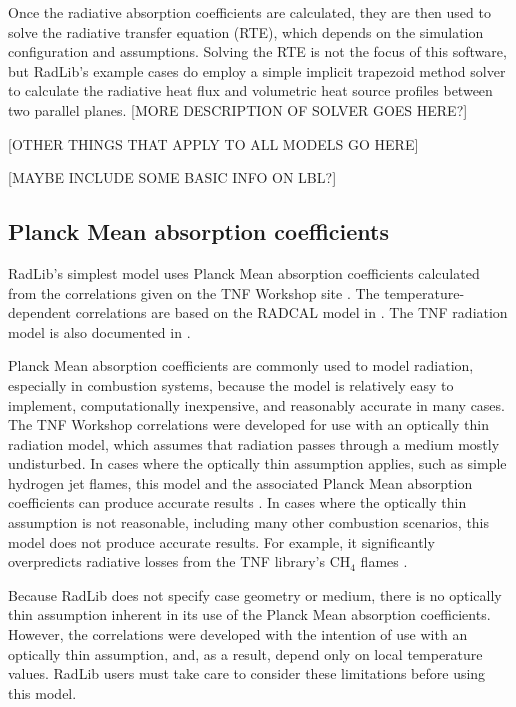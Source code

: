\documentclass[preprint,12pt, a4paper]{elsarticle}
\begin{document}
Once the radiative absorption coefficients are calculated, they are then used to solve the radiative transfer equation (RTE), which depends on the simulation configuration and assumptions. Solving the RTE is not the focus of this software, but RadLib's example cases do employ a simple implicit trapezoid method solver to calculate the radiative heat flux and volumetric heat source profiles between two parallel planes. [MORE DESCRIPTION OF SOLVER GOES HERE?]

[OTHER THINGS THAT APPLY TO ALL MODELS GO HERE]

[MAYBE INCLUDE SOME BASIC INFO ON LBL?]

\subsection{Planck Mean absorption coefficients}
\label{s:planckmean}

RadLib's simplest model uses Planck Mean absorption coefficients calculated from the correlations given on the TNF Workshop site \citep{Smith_2003}. The temperature-dependent correlations are based on the RADCAL model in \citep{Grosshandler_1993}. The TNF radiation model is also documented in \citep{Barlow_2001}.

Planck Mean absorption coefficients are commonly used to model radiation, especially in combustion systems, because the model is relatively easy to implement, computationally inexpensive, and reasonably accurate in many cases. The TNF Workshop correlations were developed for use with an optically thin radiation model, which assumes that radiation passes through a medium mostly undisturbed. In cases where the optically thin assumption applies, such as simple hydrogen jet flames, this model and the associated Planck Mean absorption coefficients can produce accurate results \citep{Barlow_1999}. In cases where the optically thin assumption is not reasonable, including many other combustion scenarios, this model does not produce accurate results. For example, it significantly overpredicts radiative losses from the TNF library's CH$_4$ flames \cite{Frank_2000,Zhu_2002,Coelho_2002}.

Because RadLib does not specify case geometry or medium, there is no optically thin assumption inherent in its use of the Planck Mean absorption coefficients. However, the correlations were developed with the intention of use with an optically thin assumption, and, as a result, depend only on local temperature values. RadLib users must take care to consider these limitations before using this model. 
\end{document}
